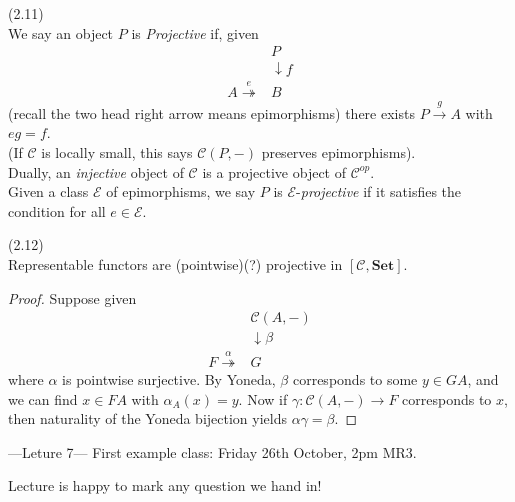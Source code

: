 \documentclass[a4paper]{article}
\begin{document}
\begin{defi} (2.11)\\
    We say an object $P$ is \emph{Projective} if, given 
    \begin{equation*}
        \begin{aligned}
            &P\\
            &\downarrow f\\
            A\stackrel{e}{\twoheadrightarrow}&B
        \end{aligned}
    \end{equation*}
    (recall the two head right arrow means epimorphisms) there exists $P \xrightarrow{g} A$ with $eg = f$.\\
    (If $\mathcal{C}$ is locally small, this says $\mathcal{C}(P,-)$ preserves epimorphisms).\\
    Dually, an \emph{injective} object of $\mathcal{C}$ is a projective object of $\mathcal{C}^{op}$.\\
    Given a class $\mathcal{E}$ of epimorphisms, we say $P$ is $\mathcal{E}$-\emph{projective} if it satisfies the condition for all $e \in \mathcal{E}$.
\end{defi}

\begin{lemma} (2.12)\\
    Representable functors are (pointwise)(?) projective in $[\mathcal{C},\mathbf{Set}]$.
    \begin{proof}
        Suppose given 
        \begin{equation*}
            \begin{aligned}
                &\mathcal{C}(A,-)\\
                &\downarrow \beta\\
                F\stackrel{\alpha}{\twoheadrightarrow}&G
            \end{aligned}
        \end{equation*}
        where $\alpha$ is pointwise surjective. By Yoneda, $\beta$ corresponds to some $y \in GA$, and we can find $x \in FA$ with $\alpha_A(x) = y$. Now if $\gamma:\mathcal{C}(A,-) \to F$ corresponds to $x$, then naturality of the Yoneda bijection yields $\alpha\gamma =\beta$.
    \end{proof}
\end{lemma}

---Leture 7---
First example class: Friday 26th October, 2pm MR3.

Lecture is happy to mark any question we hand in!
\end{document}
